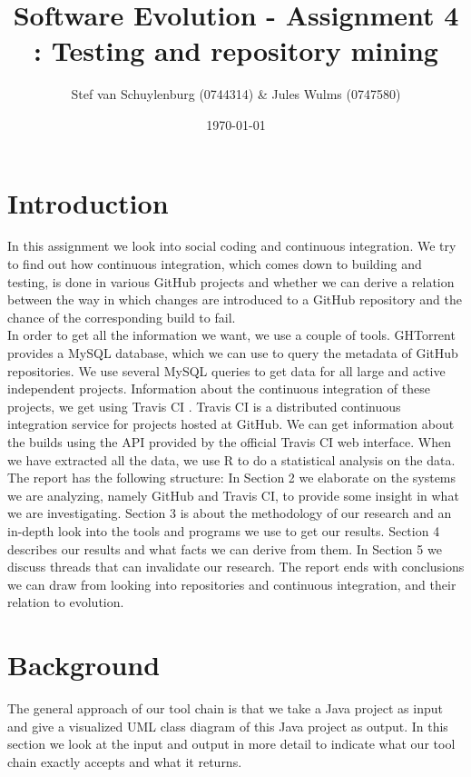 \documentclass[a4paper,11pt]{article}
\title{Software Evolution - Assignment 4 : Testing and repository mining}
\author{Stef van Schuylenburg (0744314) \& Jules Wulms (0747580)}
\date{\today}
\begin{document}
	\maketitle

	\section{Introduction}
		In this assignment we look into social coding and continuous integration. We try to find out how continuous integration, which comes down to building and testing, is done in various GitHub \cite{github} projects and whether we can derive a relation between the way in which changes are introduced to a GitHub repository and the chance of the corresponding build to fail. \\

		In order to get all the information we want, we use a couple of tools. GHTorrent \cite{ghtorrent} provides a MySQL database, which we can use to query the metadata of GitHub repositories. We use several MySQL queries to get data for all large and active independent projects. Information about the continuous integration of these projects, we get using Travis CI \cite{travis}. Travis CI is a distributed continuous integration service for projects hosted at GitHub. We can get information about the builds using the API provided by the official Travis CI web interface. When we have extracted all the data, we use R \cite{rstatistic} to do a statistical analysis on the data. \\

		The report has the following structure: In Section 2 we elaborate on the systems we are analyzing, namely GitHub and Travis CI, to provide some insight in what we are investigating. Section 3 is about the methodology of our research and an in-depth look into the tools and programs we use to get our results. Section 4 describes our results and what facts we can derive from them. In Section 5 we discuss threads that can invalidate our research. The report ends with conclusions we can draw from looking into repositories and continuous integration, and their relation to evolution.
	
	\section{Background}
		The general approach of our tool chain is that we take a Java project as input and give a visualized UML class diagram of this Java project as output. In this section we look at the input and output in more detail to indicate what our tool chain exactly accepts and what it returns.
		
\end{document}
